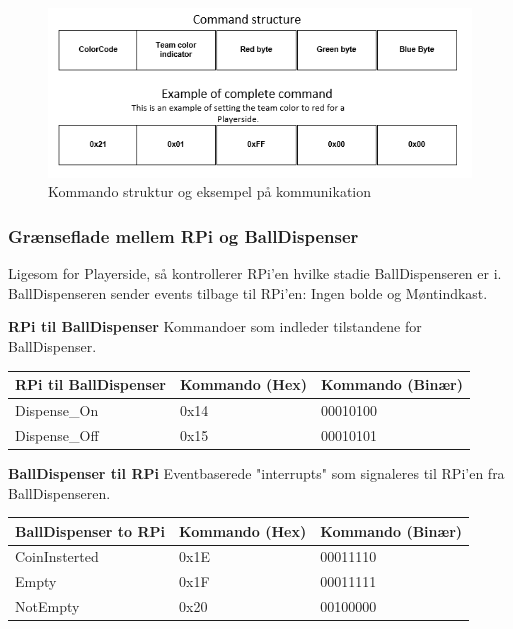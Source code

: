 \documentclass[Arkitektur/System_main.tex]{subfiles}
\begin{document}
\begin{figure}[H]
    \centering
    \includegraphics[width=\textwidth]{Arkitektur/Grenseflader/Graphics/teamColor.png}
    \caption{Kommando struktur og eksempel på kommunikation}
    \label{fig:teamColor}
\end{figure}

\subsubsection{Grænseflade mellem RPi og BallDispenser}
Ligesom for Playerside, så kontrollerer RPi'en hvilke stadie BallDispenseren er i. BallDispenseren sender events tilbage til RPi'en: Ingen bolde og Møntindkast. 

\textbf{RPi til BallDispenser}
Kommandoer som indleder tilstandene for BallDispenser. 

\begin{table}[H]
\centering
\begin{tabular}{|L{0.25\textwidth}|L{0.3\textwidth}|L{0.35\textwidth}|}
\hline
\textbf{RPi til BallDispenser} & \textbf{Kommando (Hex)} & \textbf{Kommando (Binær)} \\ \hline
Dispense\_On & 0x14 & 00010100 \\ \hline
Dispense\_Off & 0x15 & 00010101 \\ \hline
\end{tabular}
\end{table}

\textbf{BallDispenser til RPi}
Eventbaserede "interrupts" som signaleres til RPi'en fra BallDispenseren. 
\begin{table}[H]
\begin{tabular}{|L{0.25\textwidth}|L{0.3\textwidth}|L{0.35\textwidth}|}
\hline
\textbf{BallDispenser to RPi} & \textbf{Kommando (Hex)} & \textbf{Kommando (Binær)} \\ \hline
CoinInsterted & 0x1E & 00011110 \\ \hline
Empty & 0x1F & 00011111 \\ \hline
NotEmpty & 0x20 & 00100000 \\ \hline
\end{tabular}%
\end{table}
\end{document}
